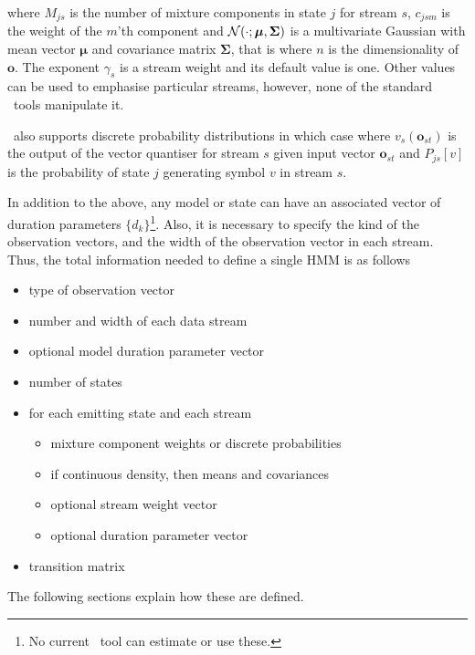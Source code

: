 where $M_{js}$ is the number of mixture components 
in state $j$ for stream $s$,
$c_{jsm}$ is the weight of the $m$'th  component and 
${\cal N}(\cdot; {\mbox{\boldmath $\mu$}}, {\mbox{\boldmath $\Sigma$}})$ is a multivariate Gaussian
with mean vector $\bm{\mu}$ and 
covariance matrix $\bm{\Sigma}$, that
is
where $n$ is the dimensionality of $\bm{o}$.  The exponent $\gamma_s$ is
a stream weight and its 
default value is one.  Other values can be
used to emphasise particular streams, however, none of the standard
\HTK\ tools manipulate it.

\HTK\ also supports discrete probability 
distributions in which
case 
where $v_s(\bm{o}_{st})$ is the output of the vector 
quantiser for stream $s$
given input vector $\bm{o}_{st}$ and $P_{js}[v]$ is the 
probability of state $j$ generating symbol $v$ in stream $s$.

In addition to the above, any model or state can have an
associated vector of duration parameters
 $\{d_k\}$\footnote{
No current \HTK\ tool can estimate or use these.
}.  
Also,
it is necessary to specify the kind of the observation
vectors, and the width of the observation vector in each stream.
Thus, the total information needed to define a single HMM is 
as follows
   \begin{itemize}
    \item type of observation vector
    \item number and width of each data stream
    \item optional model duration parameter vector
    \item number of states
    \item for each emitting state and each stream
        \begin{itemize}
           \item mixture component weights or discrete probabilities
           \item if continuous density, then means and covariances
           \item optional stream weight vector    
           \item optional duration parameter vector
         \end{itemize}  
    \item transition matrix
\end{itemize}
The following sections explain how these are defined.

